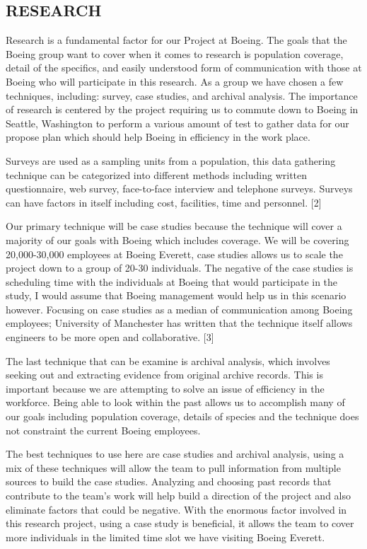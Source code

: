 \documentclass[a4,draftclsnofoot,onecolumn,margin=0.75,10pt]{IEEEtran}
\begin{document}
\subsection[RESEARCH]{\rmfamily\bfseries\color{black}
RESEARCH}

{\color{black}
   Research is a fundamental factor for our Project at Boeing. The goals that the Boeing group want to cover when it comes to research is population coverage, detail of the specifics, and easily understood form of communication with those at Boeing who will participate in this research.  As a group we have chosen a few techniques, including: survey, case studies, and archival analysis.  The importance of research is centered by the project requiring us to commute down to Boeing in Seattle, Washington to perform a various amount of test to gather data for our propose plan which should help Boeing in efficiency in the work place. 

   Surveys are used as a sampling units from a population, this data gathering technique can be categorized into different methods including written questionnaire, web survey, face-to-face interview and telephone surveys. Surveys can have factors in itself including cost, facilities, time and personnel. [2]

   Our primary technique will be case studies because the technique will cover a majority of our goals with Boeing which includes coverage. We will be covering 20,000-30,000 employees at Boeing Everett, case studies allows us to scale the project down to a group of 20-30 individuals. The negative of the case studies is scheduling time with the individuals at Boeing that would participate in the study, I would assume that Boeing management would help us in this scenario however.  Focusing on case studies as a median of communication among Boeing employees; University of Manchester has written that the technique itself allows engineers to be more open and collaborative. [3]

   The last technique that can be examine is archival analysis, which involves seeking out and extracting evidence from original archive records. This is important because we are attempting to solve an issue of efficiency in the workforce. Being able to look within the past allows us to accomplish many of our goals including population coverage, details of species and the technique does not constraint the current Boeing employees. 

   The best techniques to use here are case studies and archival analysis, using a mix of these techniques will allow the team to pull information from multiple sources to build the case studies. Analyzing and choosing past records that contribute to the team's work will help build a direction of the project and also eliminate factors that could be negative. With the enormous factor involved in this research project, using a case study is beneficial, it allows the team to cover more individuals in the limited time slot we have visiting Boeing Everett.}
\end{document}
